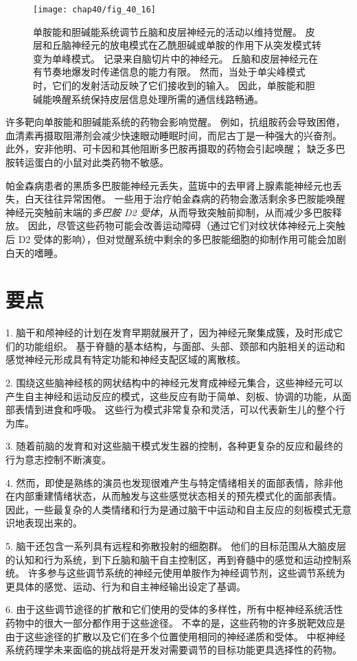 \begin{figure}[htbp]
	\centering
	\texttt{[image: chap40/fig\_40\_16]}
	\caption{单胺能和胆碱能系统调节丘脑和皮层神经元的活动以维持觉醒。
		皮层和丘脑神经元的放电模式在乙酰胆碱或单胺的作用下从突发模式转变为单峰模式。
		记录来自脑切片中的神经元。
		丘脑和皮层神经元在有节奏地爆发时传递信息的能力有限。
		然而，当处于单尖峰模式时，它们的发射活动反映了它们接收到的输入。
		因此，单胺能和胆碱能唤醒系统保持皮层信息处理所需的通信线路畅通。}
	\label{fig:40_16}
\end{figure}


许多靶向单胺能和胆碱能系统的药物会影响觉醒。
例如，抗组胺药会导致困倦，血清素再摄取阻滞剂会减少快速眼动睡眠时间，而尼古丁是一种强大的兴奋剂。
此外，安非他明、可卡因和其他阻断多巴胺再摄取的药物会引起唤醒；
缺乏多巴胺转运蛋白的小鼠对此类药物不敏感。


帕金森病患者的黑质多巴胺能神经元丢失，蓝斑中的去甲肾上腺素能神经元也丢失，白天往往异常困倦。
一些用于治疗帕金森病的药物会激活剩余多巴胺能唤醒神经元突触前末端的\textit{多巴胺 D2 受体}，从而导致突触前抑制，从而减少多巴胺释放。
因此，尽管这些药物可能会改善运动障碍（通过它们对纹状体神经元上突触后 D2 受体的影响），但对觉醒系统中剩余的多巴胺能细胞的抑制作用可能会加剧白天的嗜睡。



\section{要点}

1. 脑干和颅神经的计划在发育早期就展开了，因为神经元聚集成簇，及时形成它们的功能组织。
基于脊髓的基本结构，与面部、头部、颈部和内脏相关的运动和感觉神经元形成具有特定功能和神经支配区域的离散核。


2. 围绕这些脑神经核的网状结构中的神经元发育成神经元集合，这些神经元可以产生自主神经和运动反应的模式，这些反应有助于简单、刻板、协调的功能，从面部表情到进食和呼吸。
这些行为模式非常复杂和灵活，可以代表新生儿的整个行为库。


3. 随着前脑的发育和对这些脑干模式发生器的控制，各种更复杂的反应和最终的行为意志控制不断演变。


4. 然而，即使是熟练的演员也发现很难产生与特定情绪相关的面部表情，除非他在内部重建情绪状态，从而触发与这些感觉状态相关的预先模式化的面部表情。
因此，一些最复杂的人类情绪和行为是通过脑干中运动和自主反应的刻板模式无意识地表现出来的。


5. 脑干还包含一系列具有远程和弥散投射的细胞群。
他们的目标范围从大脑皮层的认知和行为系统，到下丘脑和脑干自主控制区，再到脊髓中的感觉和运动控制系统。
许多参与这些调节系统的神经元使用单胺作为神经调节剂，这些调节系统为更具体的感觉、运动、行为和自主神经输出设定了基调。


6. 由于这些调节途径的扩散和它们使用的受体的多样性，所有中枢神经系统活性药物中的很大一部分都作用于这些途径。
不幸的是，这些药物的许多脱靶效应是由于这些途径的扩散以及它们在多个位置使用相同的神经递质和受体。
中枢神经系统药理学未来面临的挑战将是开发对需要调节的目标功能更具选择性的药物。

